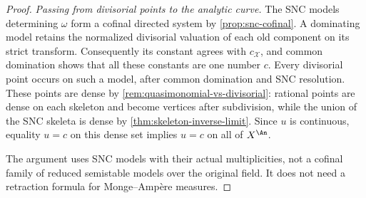 \begin{proof}
\emph{Passing from divisorial points to the analytic curve.}
The SNC models determining \(\omega\) form a cofinal directed system
by \cref{prop:snc-cofinal}.  A dominating model retains the normalized
divisorial valuation of each old component on its strict transform.
Consequently its constant agrees with \(c_{\mathcal X}\), and common
domination shows that all these constants are one number \(c\).
Every divisorial point occurs on such a model, after common domination
and SNC resolution.  These points are dense by
\cref{rem:quasimonomial-vs-divisorial}: rational points are dense on each
skeleton and become vertices after subdivision, while the union of the
SNC skeleta is dense by \cref{thm:skeleton-inverse-limit}.
Since \(u\) is continuous, equality \(u=c\) on this dense set implies
\(u=c\) on all of \(X^{\An}\).

The argument uses SNC models with their actual multiplicities, not a
cofinal family of reduced semistable models over the original field.
It does not need a retraction formula for Monge--Amp\`ere measures.
\end{proof}
